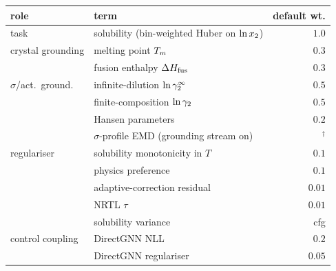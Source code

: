 \begin{table}[tp]
\centering
{\footnotesize
\begin{tabular}{@{}llr@{}}
\toprule
role & term & default wt. \\
\midrule
task                 & solubility (bin-weighted Huber on $\ln x_2$)        & $1.0$ \\
crystal grounding    & melting point $T_m$                              & $0.3$ \\
                     & fusion enthalpy $\Delta H_{\mathrm{fus}}$                         & $0.3$ \\
$\sigma$/act.\ ground.& infinite-dilution $\ln\gamma_2^\infty$                       & $0.5$ \\
                     & finite-composition $\ln\gamma_2$                        & $0.5$ \\
                     & Hansen parameters                                & $0.2$ \\
                     & $\sigma$-profile EMD (grounding stream on)        & $^\dagger$ \\
regulariser          & solubility monotonicity in $T$                   & $0.1$ \\
                     & physics preference                               & $0.1$ \\
                     & adaptive-correction residual                     & $0.01$ \\
                     & NRTL $\tau$                                       & $0.01$ \\
                     & solubility variance                              & cfg \\
control coupling     & DirectGNN NLL                                    & $0.2$ \\
                     & DirectGNN regulariser                            & $0.05$ \\

\end{tabular}}
\end{table}
